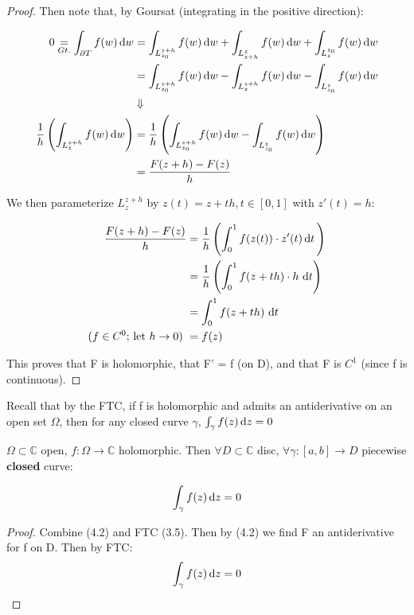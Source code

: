 \begin{proof}
Then note that, by Goursat (integrating in the positive direction):

\begin{align*}
   0 \underset{Gt.}{=}\int_{\partial T} f(w)  \dif w &= \int_{L_{z_0}^{z+h}} f(w)  \dif w + \int_{L_{z+h}^{z}} f(w)  \dif w + \int_{L_{z}^{z_0}} f(w)  \dif w\\
   &= \int_{L_{z_0}^{z+h}} f(w)  \dif w - \int_{L_{z}^{z+h}} f(w)  \dif w - \int_{L_{z_0}^{z}} f(w)  \dif w\\
   &\Downarrow\\
   \frac{1}{h}\left( \int_{L_{z}^{z+h}} f(w)  \dif w \right) &=   \frac{1}{h}\left( \int_{L_{z_0}^{z+h}} f(w)  \dif w - \int_{L_{z_0}^{z}} f(w)  \dif w \right)\\
   &= \frac{F(z+h)-F(z)}{h}
\end{align*}

We then parameterize $L_{z}^{z+h}$ by $z(t) = z+t h, t\in[0,1]$ with $z'(t) = h$:

\begin{align*}
    \frac{F(z+h)-F(z)}{h} &=  \frac{1}{h}\left( \int_0^1 f(z(t)) \cdot z'(t)  \dif t \, \right)\\
    &=\frac{1}{h}\left( \int_0^1 f(z+th) \cdot h \,  \dif t \right)\\
    &= \int_0^1 f(z+th) \,  \dif t\\
    \text{($f \in C^0$; let $h\rightarrow 0$) } &= f(z)
\end{align*}

This proves that F is holomorphic, that F' = f (on D), and that F is $C^1$ (since f is continuous).

\end{proof}

Recall that by the FTC, if f is holomorphic and admits an antiderivative on an open set $\Omega$, then for any closed curve $\gamma$, $\int_\gamma f(z) \dif z = 0$

\begin{corollary}
$\Omega \subset \mathbb{C}$ open, $f:\Omega \rightarrow \mathbb{C}$ holomorphic. Then $\forall D \subset \mathbb{C}$ disc, $\forall \gamma:[a,b] \rightarrow D$ piecewise \textbf{closed} curve:

\begin{align*}
    \int_\gamma f(z) \dif z = 0\\
\end{align*}

\end{corollary}

\begin{proof}
Combine (4.2) and FTC (3.5). Then by (4.2) we find F an antiderivative for f on D. Then by FTC:
\begin{align*}
    \int_\gamma f(z) \dif z = 0\\
\end{align*}
\end{proof}

